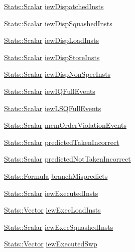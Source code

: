 \begin{DoxyCompactItemize}
\item 
\hyperlink{classStats_1_1Scalar}{Stats::Scalar} \hyperlink{classDefaultIEW_a60a497827df5bf20377131218dbb5856}{iewDispatchedInsts}
\item 
\hyperlink{classStats_1_1Scalar}{Stats::Scalar} \hyperlink{classDefaultIEW_a43a5c3a932fadd9d0cbcc8da45f6ec2e}{iewDispSquashedInsts}
\item 
\hyperlink{classStats_1_1Scalar}{Stats::Scalar} \hyperlink{classDefaultIEW_a4912d8eb8445e3613e37bd099b4838a5}{iewDispLoadInsts}
\item 
\hyperlink{classStats_1_1Scalar}{Stats::Scalar} \hyperlink{classDefaultIEW_a014a1fbd4e241bc9c3eb4d926aaf1156}{iewDispStoreInsts}
\item 
\hyperlink{classStats_1_1Scalar}{Stats::Scalar} \hyperlink{classDefaultIEW_ad97a775edfe3139e00cf90d6ce85cd6e}{iewDispNonSpecInsts}
\item 
\hyperlink{classStats_1_1Scalar}{Stats::Scalar} \hyperlink{classDefaultIEW_af14622d1e3f6f89130c87183c0fd31b1}{iewIQFullEvents}
\item 
\hyperlink{classStats_1_1Scalar}{Stats::Scalar} \hyperlink{classDefaultIEW_a98fa20b7c9538614aaba18ecf7b96cf6}{iewLSQFullEvents}
\item 
\hyperlink{classStats_1_1Scalar}{Stats::Scalar} \hyperlink{classDefaultIEW_a4cca8a82790f3c5dd13bd5c0b32ad774}{memOrderViolationEvents}
\item 
\hyperlink{classStats_1_1Scalar}{Stats::Scalar} \hyperlink{classDefaultIEW_aa848feac8bfb4947ca3acb410bfe75c6}{predictedTakenIncorrect}
\item 
\hyperlink{classStats_1_1Scalar}{Stats::Scalar} \hyperlink{classDefaultIEW_ae1cc96638781ca35cb92a5606bd508b7}{predictedNotTakenIncorrect}
\item 
\hyperlink{classStats_1_1Formula}{Stats::Formula} \hyperlink{classDefaultIEW_a84b48267a042d76990dbfb6cec760fcb}{branchMispredicts}
\item 
\hyperlink{classStats_1_1Scalar}{Stats::Scalar} \hyperlink{classDefaultIEW_a96ac594d4d0ac05306c6c3679ffbbfaa}{iewExecutedInsts}
\item 
\hyperlink{classStats_1_1Vector}{Stats::Vector} \hyperlink{classDefaultIEW_ad576ced7a991ca05c24bc21fc9d70cdc}{iewExecLoadInsts}
\item 
\hyperlink{classStats_1_1Scalar}{Stats::Scalar} \hyperlink{classDefaultIEW_a822e0e5fd3e050a7b48437eab389be0a}{iewExecSquashedInsts}
\item 
\hyperlink{classStats_1_1Vector}{Stats::Vector} \hyperlink{classDefaultIEW_ab4a8c8cadda04122d21fc9596057b8ce}{iewExecutedSwp}

\end{DoxyCompactItemize}
